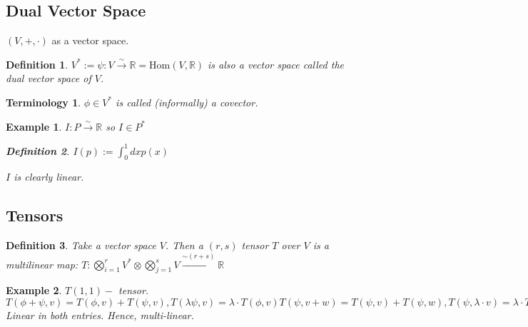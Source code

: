 \documentclass[10pt, oneside]{article}
\newcommand{\R}{\mathbb{R}}
\newtheorem{defn}{Definition}
\newtheorem{example}{Example}
\newtheorem{Terminology}{Terminology}
\begin{document}
      \subsection*{Dual Vector Space}
         $(V,+,\cdot)$ as a vector space.
         \begin{defn}
            $V^* := {\psi: V \xrightarrow{\sim} \R} = \text{Hom} (V,\R)$ is also a vector space called the dual vector space of $V$.
         \end{defn}
         \begin{Terminology}
            $\phi \in V^*$ is called (informally) a covector.
         \end{Terminology}
         \begin{example}
         $I: P \xrightarrow{\sim} \R$ so $I \in P^*$
         \begin{defn}
            $I(p) := \int_{0}^{1}dxp(x)$
         \end{defn}
         $I$ is clearly linear.
         \end{example}
      \subsection*{Tensors}
      \begin{defn}
         Take a vector space $V$. Then a $(r,s)$ tensor $T$ over $V$ is a multilinear map: $T: \bigotimes_{i=1}^{r} V^* \otimes \bigotimes_{j=1}^{s} V \xrightarrow{\sim (r+s)} \R$
      \end{defn}
      \begin{example}
         $T (1,1) - $ tensor. $T(\phi+\psi,v) = T(\phi,v)+T(\psi,v), T(\lambda \psi,v)=\lambda\cdot T(\phi,v) T(\psi,v+w)=T(\psi,v)+T(\psi,w), T(\psi,\lambda\cdot v)= \lambda \cdot T(\psi,v)$ Linear in both entries. Hence, multi-linear.
      \end{example}
\end{document}
